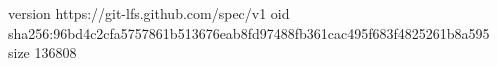 version https://git-lfs.github.com/spec/v1
oid sha256:96bd4c2cfa5757861b513676eab8fd97488fb361cac495f683f4825261b8a595
size 136808
